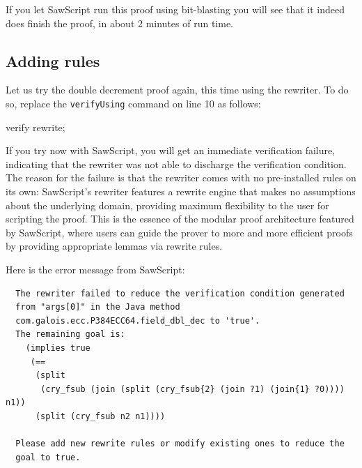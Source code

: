 \documentclass[12pt]{galois-whitepaper}
\newcommand{\sawScript}{{\sc SawScript}\xspace}
\begin{document}
If you let \sawScript run this proof using bit-blasting you will
see that it indeed does finish the proof, in about 2 minutes of run time.

\subsection{Adding rules}
Let us try the double decrement proof again, this time using the rewriter. To do so, replace the
{\tt verifyUsing} command on line 10 as follows:

\begin{code}
   verify rewrite;
\end{code}

If you try now with \sawScript, you will get an immediate verification failure, indicating that the rewriter was not able to discharge
the verification condition. The reason for the failure is that the rewriter comes with no pre-installed rules on its own: \sawScript's
rewriter features a rewrite engine that makes no assumptions about the underlying domain, providing maximum flexibility to the user
for scripting the proof. This is the essence of the modular proof architecture featured by \sawScript, where users can guide the prover
to more and more efficient proofs by providing appropriate lemmas via rewrite rules.

Here is the error message from \sawScript:
\begin{Verbatim}
  The rewriter failed to reduce the verification condition generated
  from "args[0]" in the Java method
  com.galois.ecc.P384ECC64.field_dbl_dec to 'true'.
  The remaining goal is:
    (implies true
     (==
      (split
       (cry_fsub (join (split (cry_fsub{2} (join ?1) (join{1} ?0)))) n1))
      (split (cry_fsub n2 n1))))

  Please add new rewrite rules or modify existing ones to reduce the
  goal to true.
\end{Verbatim}
\end{document}
